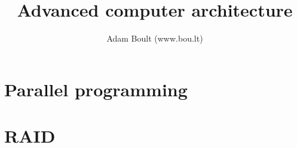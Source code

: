 \documentclass[oneside]{book}
\begin{document}
\author{Adam Boult (www.bou.lt)}
\title{Advanced computer architecture}
\maketitle

\setcounter{tocdepth}{0}
\tableofcontents



\part{Parallel programming}


\part{RAID}

\end{document}
